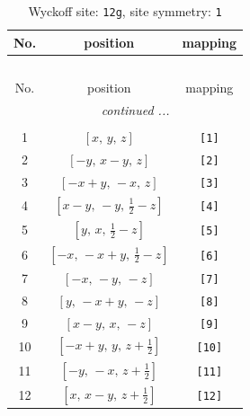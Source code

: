 \documentclass[fleqn,8pt]{jsarticle}
\begin{document}
\renewcommand{\arraystretch}{1.2}
\begin{longtable}{ccc}
\caption{Wyckoff site: {\tt 12g}, site symmetry: {\tt 1}}
 \\
 \hline \hline
No. & position & mapping \\ \hline \endfirsthead

\multicolumn{2}{l}{\tablename\ \thetable{}} \\
 \hline \hline
No. & position & mapping \\ \hline \endhead

 \hline \hline
\multicolumn{2}{r}{\footnotesize\it continued ...} \\ \endfoot

 \hline \hline
\multicolumn{2}{r}{} \\ \endlastfoot

1 & $\left[ x,\, y,\, z \right]$ & {\tt [1]} \\ \hline
2 & $\left[ - y,\, x - y,\, z \right]$ & {\tt [2]} \\ \hline
3 & $\left[ - x + y,\, - x,\, z \right]$ & {\tt [3]} \\ \hline
4 & $\left[ x - y,\, - y,\, \frac{1}{2} - z \right]$ & {\tt [4]} \\ \hline
5 & $\left[ y,\, x,\, \frac{1}{2} - z \right]$ & {\tt [5]} \\ \hline
6 & $\left[ - x,\, - x + y,\, \frac{1}{2} - z \right]$ & {\tt [6]} \\ \hline
7 & $\left[ - x,\, - y,\, - z \right]$ & {\tt [7]} \\ \hline
8 & $\left[ y,\, - x + y,\, - z \right]$ & {\tt [8]} \\ \hline
9 & $\left[ x - y,\, x,\, - z \right]$ & {\tt [9]} \\ \hline
10 & $\left[ - x + y,\, y,\, z + \frac{1}{2} \right]$ & {\tt [10]} \\ \hline
11 & $\left[ - y,\, - x,\, z + \frac{1}{2} \right]$ & {\tt [11]} \\ \hline
12 & $\left[ x,\, x - y,\, z + \frac{1}{2} \right]$ & {\tt [12]} \\
\end{longtable}
\end{document}
